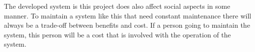 \bigskip

The developed system is this project does also affect social aspects in some manner.
To maintain a system like this that need constant maintenance there will always be a trade-off between benefits and cost.
If a person going to maintain the system, this person will be a cost that is involved with the operation of the system.

